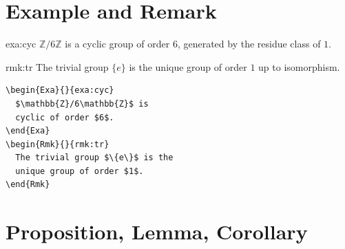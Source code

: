 \section{Example and Remark}

\begin{fullwidth}
\begin{minipage}[t]{0.48\linewidth}
\begin{Exa}{}{exa:cyc}
$\mathbb{Z}/6\mathbb{Z}$ is a cyclic group of order $6$, generated by
the residue class of $1$.
\end{Exa}
\begin{Rmk}{}{rmk:tr}
The trivial group $\{e\}$ is the unique group of order $1$ up to
isomorphism.
\end{Rmk}
\end{minipage}\hfill
\begin{minipage}[t]{0.48\linewidth}
\begin{lstlisting}[language={[LaTeX]TeX}]
\begin{Exa}{}{exa:cyc}
  $\mathbb{Z}/6\mathbb{Z}$ is
  cyclic of order $6$.
\end{Exa}
\begin{Rmk}{}{rmk:tr}
  The trivial group $\{e\}$ is the
  unique group of order $1$.
\end{Rmk}
\end{lstlisting}
\end{minipage}
\end{fullwidth}

\section{Proposition, Lemma, Corollary}

